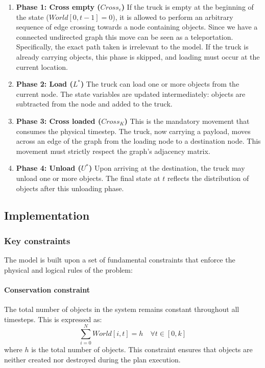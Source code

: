 \documentclass[a4paper,12pt]{article}
\begin{document}
\begin{enumerate}
    \item \textbf{Phase 1: Cross empty ($Cross_{\epsilon}$)}
          If the truck is empty at the beginning of the state ($World[0, t-1]=0$), it is allowed to perform an arbitrary sequence of edge crossing towards a node containing objects. Since we have a connected undirected graph this move can be seen as a teleportation. Specifically, the exact path taken is irrelevant to the model. If the truck is already carrying objects, this phase is skipped, and loading must occur at the current location.

    \item \textbf{Phase 2: Load ($L^*$)}
          The truck can load one or more objects from the current node. The state variables are updated intermediately: objects are subtracted from the node and added to the truck.

    \item \textbf{Phase 3: Cross loaded ($Cross_{K}$)}
          This is the mandatory movement that consumes the physical timestep. The truck, now carrying a payload, moves across an edge of the graph from the loading node to a destination node. This movement must strictly respect the graph's adjacency matrix.

    \item \textbf{Phase 4: Unload ($U^*$)}
          Upon arriving at the destination, the truck may unload one or more objects. The final state at $t$ reflects the distribution of objects after this unloading phase.
\end{enumerate}

\subsection{Implementation}

\subsubsection{Key constraints}
The model is built upon a set of fundamental constraints that enforce the physical and logical rules of the problem:

\paragraph{Conservation constraint} The total number of objects in the system remains constant throughout all timesteps. This is expressed as:
$$\sum_{i=0}^{N} World[i, t] = h \quad \forall t \in [0, k]$$
where $h$ is the total number of objects. This constraint ensures that objects are neither created nor destroyed during the plan execution.
\end{document}
